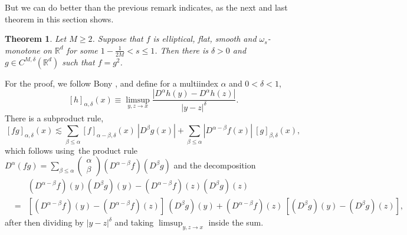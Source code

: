 \documentclass{amsart}
\newtheorem{theorem}{Theorem}[section]
\theoremstyle{plain}
\numberwithin{equation}{section}
\begin{document}
But we can do better than the previous remark indicates, as the next and
last theorem in this section shows.

\begin{theorem}
\label{1/4 thm}Let $M\geq 2$. Suppose that $f$ is elliptical, flat, smooth
and $\omega _{s}$-monotone on $\mathbb{R}^{d}$ for some $1-\frac{1}{2M}%
<s\leq 1$. Then there is $\delta >0$ and $g\in C^{M,\delta }\left( \mathbb{R}%
^{d}\right) $ such that $f=g^{2}$.
\end{theorem}

For the proof, we follow Bony \cite[Subsection 5.1]{Bon}, and define for a
multiindex $\alpha $ and $0<\delta <1$,%
\begin{equation}
\left[ h\right] _{\alpha ,\delta }\left( x\right) \equiv
\limsup_{y,z\rightarrow x}\frac{\left\vert D^{\alpha }h\left( y\right)
-D^{\alpha }h\left( z\right) \right\vert }{\left\vert y-z\right\vert
^{\delta }}.  \label{def mod D}
\end{equation}%
%
%
%
%
%
%
There is a subproduct rule,%
\begin{equation}
\left[ fg\right] _{\alpha ,\delta }\left( x\right) \lesssim \sum_{\beta \leq
\alpha }\left[ f\right] _{\alpha -\beta ,\delta }\left( x\right) \
\left\vert D^{\beta }g\left( x\right) \right\vert +\sum_{\beta \leq \alpha
}\left\vert D^{\alpha -\beta }f\left( x\right) \right\vert \ \left[ g\right]
_{\beta ,\delta }\left( x\right) ,  \label{subproduct}
\end{equation}%
which follows using\ the product rule $D^{\alpha }\left( fg\right)
=\sum_{\beta \leq \alpha }\left( 
\begin{array}{c}
\alpha \\ 
\beta%
\end{array}%
\right) \left( D^{\alpha -\beta }f\right) \left( D^{\beta }g\right) $ and
the decomposition%
\begin{eqnarray*}
&&\left( D^{\alpha -\beta }f\right) \left( y\right) \left( D^{\beta
}g\right) \left( y\right) -\left( D^{\alpha -\beta }f\right) \left( z\right)
\left( D^{\beta }g\right) \left( z\right) \\
&=&\left[ \left( D^{\alpha -\beta }f\right) \left( y\right) -\left(
D^{\alpha -\beta }f\right) \left( z\right) \right] \ \left( D^{\beta
}g\right) \left( y\right) +\left( D^{\alpha -\beta }f\right) \left( z\right)
\ \left[ \left( D^{\beta }g\right) \left( y\right) -\left( D^{\beta
}g\right) \left( z\right) \right] ,
\end{eqnarray*}%
after then dividing by $\left\vert y-z\right\vert ^{\delta }$ and taking $%
\limsup_{y,z\rightarrow x}$ inside the sum.
\end{document}
